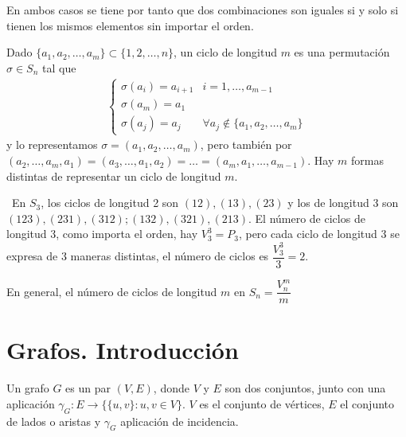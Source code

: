 En ambos casos se tiene por tanto que dos combinaciones son iguales si y solo si tienen los mismos elementos sin importar el orden.

\begin{prop}
    
\end{prop}

\begin{definicion}
    Dado $\{a_1,a_2,\dots,a_m\}\subset \{1,2,\dots,n\}$, un ciclo de longitud $m$ es una permutación $\sigma \in S_n$ tal que
    \begin{align*}
        \left\{
        \begin{array}{ll}
            \sigma(a_i)= a_{i+1} & i=1,\dots,a_{m-1}\\
            \sigma(a_m)=a_1\\
            \sigma(a_j)=a_j & \forall a_j \notin\{a_1,a_2,\dots,a_m\}
        \end{array}
        \right.
    \end{align*}
    y lo representamos $\sigma = (a_1,a_2,\dots,a_m)$, pero también por $(a_2,\dots,a_m,a_1) = (a_3,\dots,a_1,a_2) = \dots = (a_m,a_1,\dots,a_{m-1})$. Hay $m$ formas distintas de representar un ciclo de longitud $m$.
\end{definicion}

\begin{ejemplo}\
    En $S_3$, los ciclos de longitud 2 son $(12), (13), (23)$ y los de longitud 3 son $(123), (231), (312); (132), (321), (213)$. El número de ciclos de longitud 3, como importa el orden, hay $V_3^3 = P_3$, pero cada ciclo de longitud 3 se expresa de 3 maneras distintas, el número de ciclos es $\dfrac{V_3^3}{3} = 2$.

    En general, el número de ciclos de longitud $m$ en $S_n = \dfrac{V_n^m}{m} $%
\end{ejemplo}

\section{Grafos. Introducción}

\begin{definicion}
    Un grafo $G$ es un par $(V,E)$, donde $V$ y $E$ son dos conjuntos, junto con una aplicación $\gamma_G:E \to \{\{u,v\} : u,v\in V\}$. $V$ es el conjunto de vértices, $E$ el conjunto de lados o aristas y $\gamma_G$ aplicación de incidencia.
\end{definicion}

